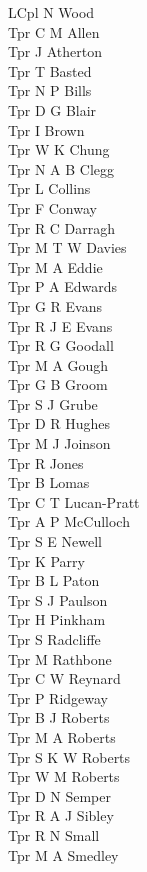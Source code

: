 \begin{multicols}{4}
  LCpl N Wood \\
  Tpr C M Allen \\
  Tpr J Atherton \\
  Tpr T Basted \\
  Tpr N P Bills \\
  Tpr D G Blair \\
  Tpr I Brown \\
  Tpr W K Chung \\
  Tpr N A B Clegg \\
  Tpr L Collins \\
  Tpr F Conway \\
  Tpr R C Darragh \\
  Tpr M T W Davies \\
  Tpr M A Eddie \\
  Tpr P A Edwards \\
  Tpr G R Evans \\
  Tpr R J E Evans \\
  Tpr R G Goodall \\
  Tpr M A Gough \\
  Tpr G B Groom \\
  Tpr S J Grube \\
  Tpr D R Hughes \\
  Tpr M J Joinson \\
  Tpr R Jones \\
  Tpr B Lomas \\
  Tpr C T Lucan-Pratt \\
  Tpr A P McCulloch \\
  Tpr S E Newell \\
  Tpr K Parry \\
  Tpr B L Paton \\
  Tpr S J Paulson \\
  Tpr H Pinkham \\
  Tpr S Radcliffe \\
  Tpr M Rathbone \\
  Tpr C W Reynard \\
  Tpr P Ridgeway \\
  Tpr B J Roberts \\
  Tpr M A Roberts \\
  Tpr S K W Roberts \\
  Tpr W M Roberts \\
  Tpr D N Semper \\
  Tpr R A J Sibley \\
  Tpr R N Small \\
  Tpr M A Smedley \\

\end{multicols}
